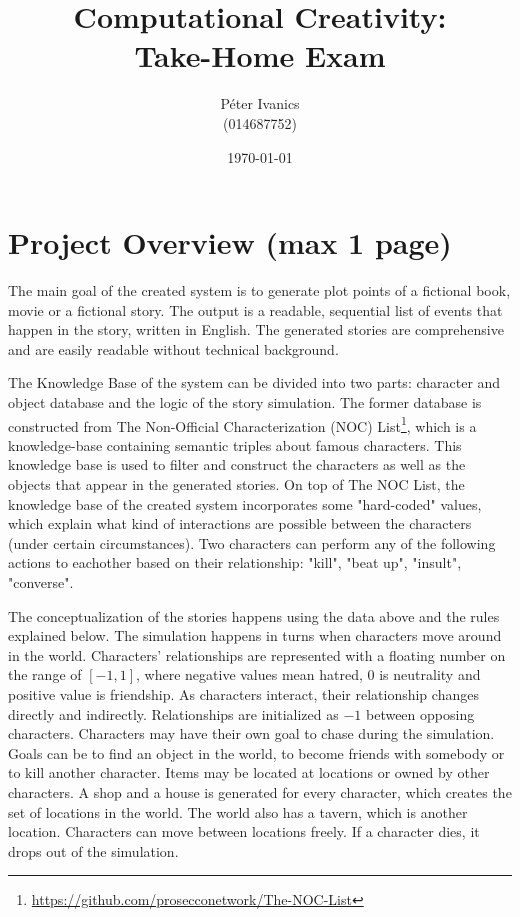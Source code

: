 \documentclass[english]{tktltiki}
\begin{document}
    \singlespacing
    
    \title{Computational Creativity: \\
    Take-Home Exam}
    
    \author{P\'eter Ivanics \\
    (014687752)}
    
    \date{\today}
    
    \maketitle
    
    
    \section{Project Overview (max 1 page)}
    The main goal of the created system is to generate plot points of a fictional book, movie or a fictional story. The output is a readable, sequential list of events that happen in the story, written in English. The generated stories are comprehensive and are easily readable without technical background. 
    
    The Knowledge Base of the system can be divided into two parts: character and object database and the logic of the story simulation. The former database is constructed from The Non-Official Characterization (NOC) List\footnote{\url{https://github.com/prosecconetwork/The-NOC-List}}, which is a knowledge-base containing semantic triples about famous characters. This knowledge base is used to filter and construct the characters as well as the objects that appear in the generated stories. On top of The NOC List, the knowledge base of the created system incorporates some "hard-coded" values, which explain what kind of interactions are possible between the characters (under certain circumstances). Two characters can perform any of the following actions to eachother based on their relationship: "kill", "beat up", "insult", "converse".
    
    The conceptualization of the stories happens using the data above and the rules explained below. The simulation happens in turns when characters move around in the world.  Characters' relationships are represented with a floating number on the range of $[-1, 1]$, where negative values mean hatred, $0$ is neutrality and positive value is friendship. As characters interact, their relationship changes directly and indirectly. Relationships are initialized as $-1$ between opposing characters. Characters may have their own goal to chase during the simulation. Goals can be to find an object in the world, to become friends with somebody or to kill another character. Items may be located at locations or owned by other characters. A shop and a house is generated for every character, which creates the set of locations in the world. The world also has a tavern, which is another location. Characters can move between locations freely. If a character dies, it drops out of the simulation. 
\end{document}
